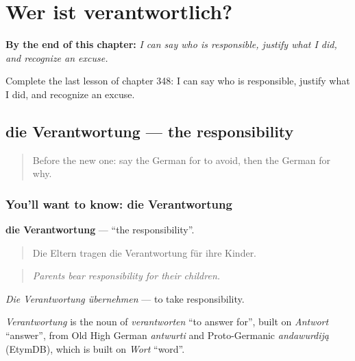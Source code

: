 
\chapter{Wer ist verantwortlich?}
\label{ch:ge-wer-ist-verantwortlich}

\begin{chapteropening}
\textbf{By the end of this chapter:} \emph{I can say who is responsible, justify what I did, and recognize an excuse.}

Complete the last lesson of chapter 348: I can say who is responsible, justify what I did, and recognize an excuse.
\end{chapteropening}

\section[die Verantwortung]{die Verantwortung — the responsibility}

\label{lesson:GE-C348-verantwortung}



\begin{quote}
Before the new one: say the German for to avoid, then the German for why.
\end{quote}

\subsection*{You'll want to know: die Verantwortung}
\textbf{die Verantwortung} — \textquotedblleft{}the responsibility\textquotedblright{}.

\begin{quote}
Die Eltern tragen die Verantwortung für ihre Kinder.
\end{quote}

\begin{quote}
\emph{Parents bear responsibility for their children.}
\end{quote}

\emph{Die Verantwortung übernehmen} — to take responsibility.

\begin{cousinweb}
\emph{Verantwortung} is the noun of \emph{verantworten} \textquotedblleft{}to answer for\textquotedblright{}, built on \emph{Antwort} \textquotedblleft{}answer\textquotedblright{}, from Old High German \emph{antwurti} and Proto-Germanic \emph{andawurdiją} (EtymDB), which is built on \emph{Wort} \textquotedblleft{}word\textquotedblright{}.
\end{cousinweb}

